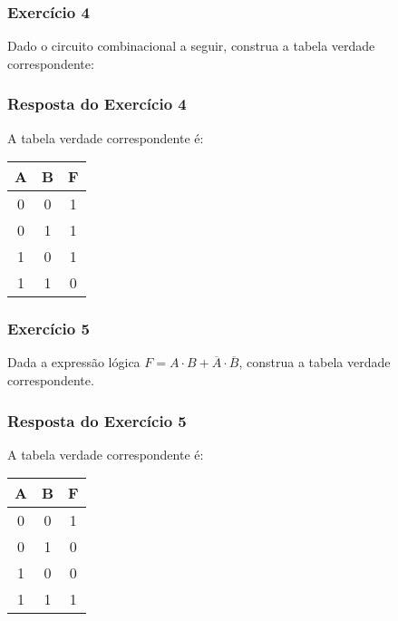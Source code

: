 \documentclass{beamer}
\begin{document}
	\begin{frame}
		\frametitle{Exercício 4}
		Dado o circuito combinacional a seguir, construa a tabela verdade correspondente:
		\begin{center}
		\end{center}
	\end{frame}
	
	\begin{frame}
		\frametitle{Resposta do Exercício 4}
		A tabela verdade correspondente é:
		\begin{center}
			\begin{tabular}{|c|c|c|}
				\hline
				A & B & F \\
				\hline
				0 & 0 & 1 \\
				0 & 1 & 1 \\
				1 & 0 & 1 \\
				1 & 1 & 0 \\
				\hline
			\end{tabular}
		\end{center}
	\end{frame}
	
	\begin{frame}
		\frametitle{Exercício 5}
		Dada a expressão lógica \( F = A \cdot B + \overline{A} \cdot \overline{B} \), construa a tabela verdade correspondente.
	\end{frame}
	
	\begin{frame}
		\frametitle{Resposta do Exercício 5}
		A tabela verdade correspondente é:
		\begin{center}
			\begin{tabular}{|c|c|c|}
				\hline
				A & B & F \\
				\hline
				0 & 0 & 1 \\
				0 & 1 & 0 \\
				1 & 0 & 0 \\
				1 & 1 & 1 \\
				\hline
			\end{tabular}
		\end{center}
	\end{frame}
	
\end{document}
